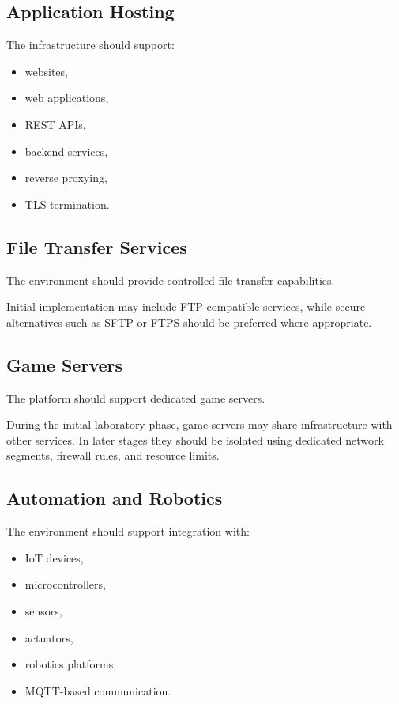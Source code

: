 \subsection{Application Hosting}

The infrastructure should support:

\begin{itemize}
    \item websites,
    \item web applications,
    \item REST APIs,
    \item backend services,
    \item reverse proxying,
    \item TLS termination.
\end{itemize}

\subsection{File Transfer Services}

The environment should provide controlled file transfer capabilities.

Initial implementation may include FTP-compatible services, while secure
alternatives such as SFTP or FTPS should be preferred where appropriate.

\subsection{Game Servers}

The platform should support dedicated game servers.

During the initial laboratory phase, game servers may share infrastructure
with other services. In later stages they should be isolated using dedicated
network segments, firewall rules, and resource limits.

\subsection{Automation and Robotics}

The environment should support integration with:

\begin{itemize}
    \item IoT devices,
    \item microcontrollers,
    \item sensors,
    \item actuators,
    \item robotics platforms,
    \item MQTT-based communication.
\end{itemize}

